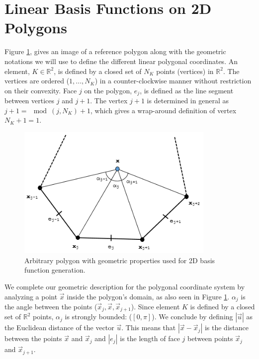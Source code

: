 \section{Linear Basis Functions on 2D Polygons}
\label{sec::BF_2DLinear}

Figure \ref{fig::BF_2D_ref_polygon}, gives an image of a reference polygon along with the geometric notations we will use to define the different linear polygonal coordinates. An element, $K\in \mathbb{R}^2$, is defined by a closed set of $N_K$ points (vertices) in $\mathbb{R}^2$. The vertices are ordered ($1,...,N_K$) in a counter-clockwise manner without restriction on their convexity. Face $j$ on the polygon, $e_j$, is defined as the line segment between vertices $j$ and $j+1$. The vertex $j+1$ is determined in general as $j+1 =\mod(j,N_K)+1$, which gives a wrap-around definition of vertex $N_K+1 = 1$.

\begin{figure}
\centering
\includegraphics[width=0.85\textwidth]{figures/sec_BF/ref_polygon_Rev1.png}
\caption{Arbitrary polygon with geometric properties used for 2D basis function generation.}
\label{fig::BF_2D_ref_polygon}
\end{figure}

We complete our geometric description for the polygonal coordinate system by analyzing a point $\vec{x}$ inside the polygon's domain, as also seen in Figure \ref{fig::BF_2D_ref_polygon}. $\alpha_j$ is the angle between the points ($\vec{x}_j, \vec{x}, \vec{x}_{j+1}$). Since element $K$ is defined by a closed set of $\mathbb{R}^2$ points, $\alpha_j$ is strongly bounded: ($[0, \pi]$). We conclude by defining $|\vec{u}|$ as the Euclidean distance of the vector $\vec{u}$. This means that $|\vec{x} - \vec{x}_j|$ is the distance between the points $\vec{x}$ and $\vec{x}_j$ and $|e_j|$ is the length of face $j$ between points $\vec{x}_j$ and $\vec{x}_{j+1}$.


